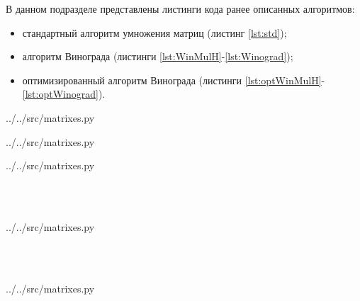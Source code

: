 В данном подразделе представлены листинги кода ранее описанных алгоритмов:
\begin{itemize}[left=\parindent]
    \item стандартный алгоритм умножения матриц (листинг \ref{lst:std});
    \item алгоритм Винограда (листинги \ref{lst:WinMulH}-\ref{lst:Winograd});
    \item оптимизированный алгоритм Винограда (листинги
          \ref{lst:optWinMulH}-\ref{lst:optWinograd}).
\end{itemize}

\noindent
\begin{minipage}{\linewidth}
\begin{lstinputlisting}[
	caption={Реализация стандартного алгоритма умножения матриц},
	label={lst:std},
	linerange={19-31}
]{../../src/matrixes.py}
\end{lstinputlisting}
\end{minipage}

\noindent
\begin{minipage}{\linewidth}
\begin{lstinputlisting}[
    caption={Реализация подпрограммы алгоритма Винограда для расчета значений
             массива mulH},
	label={lst:WinMulH},
    linerange={34-44}
]{../../src/matrixes.py}
\end{lstinputlisting}
\end{minipage}

\noindent
\begin{minipage}{\linewidth}
\begin{lstinputlisting}[
    caption={Реализация подпрограммы алгоритма Винограда для расчета значений
             массива mulV},
	label={lst:WinMulV},
    linerange={47-57}
]{../../src/matrixes.py}
\end{lstinputlisting}
\end{minipage}
\\
\\
\noindent
\begin{minipage}{\linewidth}
\begin{lstinputlisting}[
	caption={Реализация алгоритма Винограда},
	label={lst:Winograd},
    linerange={60-82}
]{../../src/matrixes.py}
\end{lstinputlisting}
\end{minipage}
\\
\\
\noindent
\begin{minipage}{\linewidth}
\begin{lstinputlisting}[
    caption={Реализация подпрограммы оптимизированного алгоритма Винограда для
    расчета значений массива mulH},
	label={lst:optWinMulH},
    linerange={85-95}
]{../../src/matrixes.py}
\end{lstinputlisting}
\end{minipage}

